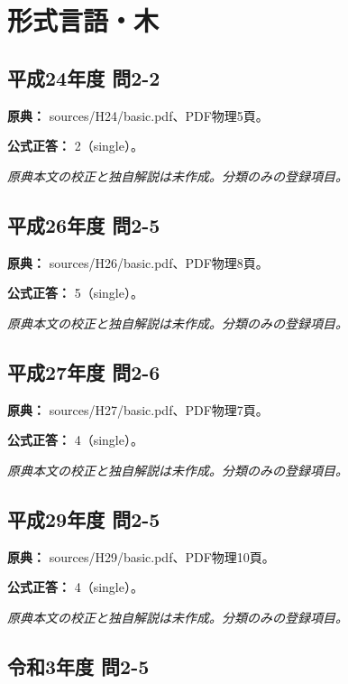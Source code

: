 \section{形式言語・木}

\subsection{平成24年度 問2-2}
\label{q:h24-reg-basic-2-2}

\noindent\textbf{原典：} sources/H24/basic.pdf、PDF物理5頁。

\textbf{公式正答：} 2（single）。

\par\textit{原典本文の校正と独自解説は未作成。分類のみの登録項目。}

\subsection{平成26年度 問2-5}
\label{q:h26-reg-basic-2-5}

\noindent\textbf{原典：} sources/H26/basic.pdf、PDF物理8頁。

\textbf{公式正答：} 5（single）。

\par\textit{原典本文の校正と独自解説は未作成。分類のみの登録項目。}

\subsection{平成27年度 問2-6}
\label{q:h27-reg-basic-2-6}

\noindent\textbf{原典：} sources/H27/basic.pdf、PDF物理7頁。

\textbf{公式正答：} 4（single）。

\par\textit{原典本文の校正と独自解説は未作成。分類のみの登録項目。}

\subsection{平成29年度 問2-5}
\label{q:h29-reg-basic-2-5}

\noindent\textbf{原典：} sources/H29/basic.pdf、PDF物理10頁。

\textbf{公式正答：} 4（single）。

\par\textit{原典本文の校正と独自解説は未作成。分類のみの登録項目。}

\subsection{令和3年度 問2-5}
\label{q:r03-reg-basic-2-5}

